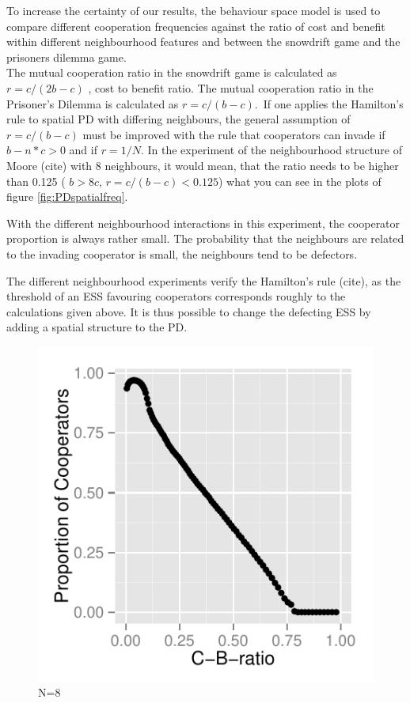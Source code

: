 \documentclass[DIV=calc, paper=a4, fontsize=11pt, twocolumn]{scrartcl}	 %
\begin{document}
To increase the certainty of our results, the behaviour space model is used to compare different cooperation frequencies against the ratio of cost and benefit within different neighbourhood features and between the snowdrift game and the prisoners dilemma game. \\
The mutual cooperation ratio in the snowdrift game is calculated as $r = c / (2b-c)$ , cost to benefit ratio. The mutual cooperation ratio in the Prisoner's Dilemma is calculated as $r = c/ (b-c) $.\
If one applies the Hamilton's rule to spatial PD with differing neighbours, the general assumption of $r = c / (b-c) $ must be improved with the rule that cooperators can invade if $ b - n * c > 0$ and if $ r = 1/N $. In the experiment of the neighbourhood structure of Moore (cite) with 8 neighbours, it would mean, that the ratio needs to be higher than 0.125 ( $b > 8c$, $ r = c/(b-c) < 0.125$) what you can see in the plots of figure \ref{fig:PDspatialfreq}. 

With the different neighbourhood interactions in this experiment, the cooperator proportion is always rather small. The probability that the neighbours are related to the invading cooperator is small, the neighbours tend to be defectors. 

The different neighbourhood experiments verify the Hamilton's rule (cite), as the threshold of an ESS favouring cooperators corresponds roughly to the calculations given above. It is thus possible to change the defecting ESS by adding a spatial structure to the PD. \\

\begin{figure}[here]
\centering
\begin{minipage}{.35\textwidth}
  \centering
  \includegraphics[width=1\linewidth]{HDN8}
 \caption{N=8}
\label{fig:HDm1}
\end{minipage}%
\end{figure}
\end{document}
